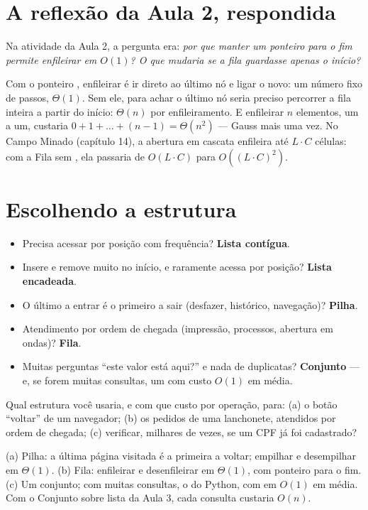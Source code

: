 \section{A reflexão da Aula 2, respondida}

Na atividade da Aula 2, a pergunta era: \emph{por que manter um ponteiro para o fim permite
enfileirar em $O(1)$? O que mudaria se a fila guardasse apenas o início?}

Com o ponteiro , enfileirar é ir direto ao último nó e ligar o novo: um número fixo de
passos, $\Theta(1)$. Sem ele, para achar o último nó seria preciso percorrer a fila inteira a
partir do início: $\Theta(n)$ por enfileiramento. E enfileirar $n$ elementos, um a um, custaria
$0 + 1 + \dots + (n - 1) = \Theta(n^2)$ — Gauss mais uma vez. No Campo Minado (capítulo 14), a
abertura em cascata enfileira até $L \cdot C$ células: com a Fila sem , ela passaria
de $O(L \cdot C)$ para $O((L \cdot C)^2)$.

\section{Escolhendo a estrutura}

\begin{itemize}
  \item Precisa acessar por posição com frequência? \textbf{Lista contígua}.
  \item Insere e remove muito no início, e raramente acessa por posição? \textbf{Lista encadeada}.
  \item O último a entrar é o primeiro a sair (desfazer, histórico, navegação)? \textbf{Pilha}.
  \item Atendimento por ordem de chegada (impressão, processos, abertura em ondas)? \textbf{Fila}.
  \item Muitas perguntas \enquote{este valor está aqui?} e nada de duplicatas? \textbf{Conjunto} — e,
        se forem muitas consultas, um  com custo $O(1)$ em média.
\end{itemize}

\begin{exrapido}
Qual estrutura você usaria, e com que custo por operação, para: (a) o botão \enquote{voltar} de um
navegador; (b) os pedidos de uma lanchonete, atendidos por ordem de chegada; (c) verificar, milhares
de vezes, se um CPF já foi cadastrado?
\end{exrapido}

\begin{respostas}
   (a) Pilha: a última página visitada é a primeira a voltar; empilhar e desempilhar
  em $\Theta(1)$. (b) Fila: enfileirar e desenfileirar em $\Theta(1)$, com ponteiro para o fim.
  (c) Um conjunto; com muitas consultas, o  do Python, com  em $O(1)$ em
  média. Com o Conjunto sobre lista da Aula 3, cada consulta custaria $O(n)$.
\end{respostas}

